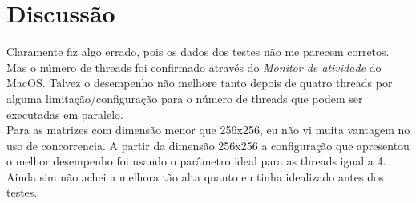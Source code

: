 \section{Discussão}
Claramente fiz algo errado, pois os dados dos testes não me parecem corretos. \\
Mas o número de threads foi confirmado através do \textit{Monitor de atividade} do MacOS. Talvez o desempenho não melhore tanto depois de quatro threads por alguma limitação/configuração para o número de threads que podem ser executadas em paralelo. \\
Para as matrizes com dimensão menor que 256x256, eu não vi muita vantagem no uso de concorrencia. A partir da dimensão 256x256 a configuração que apresentou o melhor desempenho foi usando o parâmetro ideal para as threads igual a 4.  Ainda sim não achei a melhora tão alta quanto eu tinha idealizado antes dos testes. %